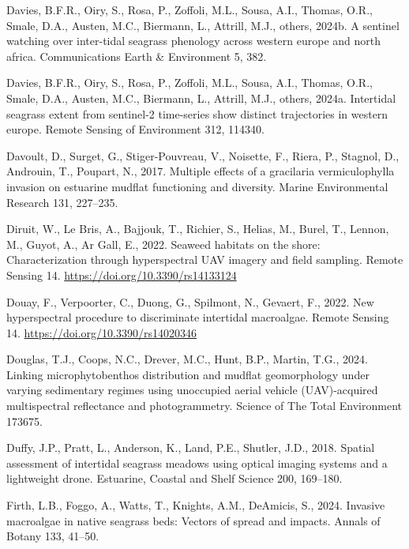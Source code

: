 \documentclass[
  letterpaper,
  DIV=11,
  numbers=noendperiod]{scrartcl}
\newlength{\cslhangindent}
\newenvironment{CSLReferences}[2] %
 {\begin{list}{}{%
  \setlength{\itemindent}{0pt}
  \setlength{\leftmargin}{0pt}
  \setlength{\parsep}{0pt}
  \ifodd #1
   \setlength{\leftmargin}{\cslhangindent}
   \setlength{\itemindent}{-1\cslhangindent}
  \fi
  \setlength{\itemsep}{#2\baselineskip}}}
 {\end{list}}
\begin{document}
\begin{CSLReferences}{1}{0}
Davies, B.F.R., Oiry, S., Rosa, P., Zoffoli, M.L., Sousa, A.I., Thomas,
O.R., Smale, D.A., Austen, M.C., Biermann, L., Attrill, M.J., others,
2024b. A sentinel watching over inter-tidal seagrass phenology across
western europe and north africa. Communications Earth \& Environment 5,
382.

Davies, B.F.R., Oiry, S., Rosa, P., Zoffoli, M.L., Sousa, A.I., Thomas,
O.R., Smale, D.A., Austen, M.C., Biermann, L., Attrill, M.J., others,
2024a. Intertidal seagrass extent from sentinel-2 time-series show
distinct trajectories in western europe. Remote Sensing of Environment
312, 114340.

Davoult, D., Surget, G., Stiger-Pouvreau, V., Noisette, F., Riera, P.,
Stagnol, D., Androuin, T., Poupart, N., 2017. Multiple effects of a
gracilaria vermiculophylla invasion on estuarine mudflat functioning and
diversity. Marine Environmental Research 131, 227--235.

Diruit, W., Le Bris, A., Bajjouk, T., Richier, S., Helias, M., Burel,
T., Lennon, M., Guyot, A., Ar Gall, E., 2022. Seaweed habitats on the
shore: Characterization through hyperspectral UAV imagery and field
sampling. Remote Sensing 14. \url{https://doi.org/10.3390/rs14133124}

Douay, F., Verpoorter, C., Duong, G., Spilmont, N., Gevaert, F., 2022.
New hyperspectral procedure to discriminate intertidal macroalgae.
Remote Sensing 14. \url{https://doi.org/10.3390/rs14020346}

Douglas, T.J., Coops, N.C., Drever, M.C., Hunt, B.P., Martin, T.G.,
2024. Linking microphytobenthos distribution and mudflat geomorphology
under varying sedimentary regimes using unoccupied aerial vehicle
(UAV)-acquired multispectral reflectance and photogrammetry. Science of
The Total Environment 173675.

Duffy, J.P., Pratt, L., Anderson, K., Land, P.E., Shutler, J.D., 2018.
Spatial assessment of intertidal seagrass meadows using optical imaging
systems and a lightweight drone. Estuarine, Coastal and Shelf Science
200, 169--180.

Firth, L.B., Foggo, A., Watts, T., Knights, A.M., DeAmicis, S., 2024.
Invasive macroalgae in native seagrass beds: Vectors of spread and
impacts. Annals of Botany 133, 41--50.


\end{CSLReferences}
\end{document}
